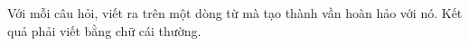 Với mỗi câu hỏi, viết ra trên một dòng từ mà tạo thành vần hoàn hảo với nó. Kết quả phải viết bằng chữ cái thường.